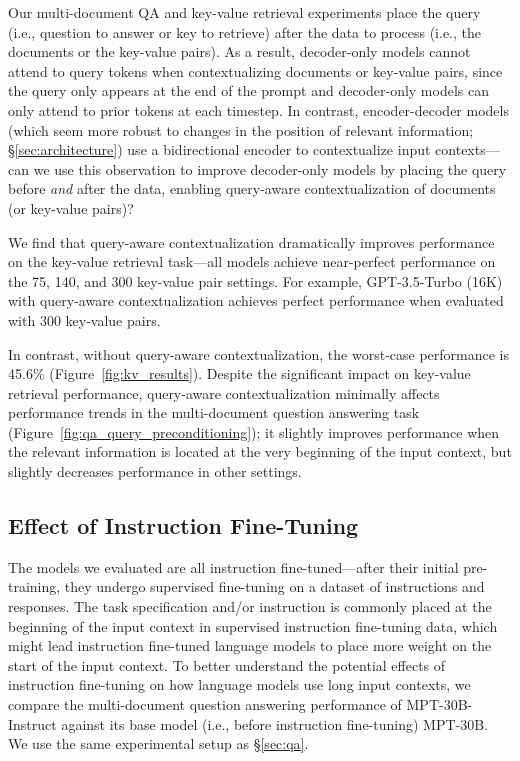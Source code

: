 Our multi-document QA and key-value retrieval experiments place the query (i.e., question to answer or key to retrieve) after the data to process (i.e., the documents or the key-value pairs). As a result, decoder-only models cannot attend to query tokens when contextualizing documents or key-value pairs, since the query only appears at the end of the prompt and decoder-only models can only attend to prior tokens at each timestep. In contrast, encoder-decoder models (which seem more robust to changes in the position of relevant information; \S\ref{sec:architecture}) use a bidirectional encoder to contextualize input contexts---can we use this observation to improve decoder-only models by placing the query before \emph{and} after the data, enabling query-aware contextualization of documents (or key-value pairs)?

We find that query-aware contextualization dramatically improves performance on the key-value retrieval task---all models achieve near-perfect performance on the 75, 140, and 300 key-value pair settings. For example, GPT-3.5-Turbo (16K) with query-aware contextualization achieves perfect performance when evaluated with 300 key-value pairs.

In contrast, without query-aware contextualization, the worst-case performance is 45.6\% (Figure~\ref{fig:kv_results}).
Despite the significant impact on key-value retrieval performance, query-aware contextualization minimally affects performance trends in the multi-document question answering task (Figure~\ref{fig:qa_query_preconditioning}); it slightly improves performance when the relevant information is located at the very beginning of the input context, but slightly decreases performance in other settings.

\subsection{Effect of Instruction Fine-Tuning}\label{sec:instruction_tuning}

The models we evaluated are all instruction fine-tuned---after their initial pre-training, they undergo supervised fine-tuning on a dataset of instructions and responses. The task specification and/or instruction is commonly placed at the beginning of the input context in supervised instruction fine-tuning data, which might lead instruction fine-tuned language models to place more weight on the start of the input context. To better understand the potential effects of instruction fine-tuning on how language models use long input contexts, we compare the multi-document question answering performance of MPT-30B-Instruct against its base model (i.e., before instruction fine-tuning) MPT-30B. We use the same experimental setup as \S\ref{sec:qa}.

